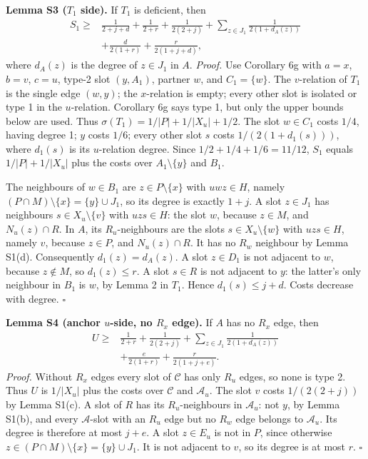 \textbf{Lemma S3 ($T_1$ side).} If $T_1$ is deficient, then
\[
\begin{aligned}
 S_1\ge{}&\frac1{2+j+d}+\frac1{2+r}+\frac1{2(2+j)}
       +\sum_{z\in J_1}\frac1{2(1+d_A(z))}\\
       &+\frac d{2(1+r)}+\frac r{2(1+j+d)},
\end{aligned}
\]
where $d_A(z)$ is the degree of $z\in J_1$ in $A$.
\emph{Proof.} Use Corollary 6g with $a=x$, $b=v$, $c=u$, type-2 slot $(y,A_1)$, partner $w$, and $C_1=\{w\}$. The $v$-relation of $T_1$ is the single edge $(w,y)$; the $x$-relation is empty; every other slot is isolated or type 1 in the $u$-relation. Corollary 6g says type 1, but only the upper bounds below are used. Thus $\sigma(T_1)=1/|P|+1/|X_u|+1/2$. The slot $w\in C_1$ costs $1/4$, having degree 1; $y$ costs $1/6$; every other slot $s$ costs $1/(2(1+d_1(s)))$, where $d_1(s)$ is its $u$-relation degree. Since $1/2+1/4+1/6=11/12$, $S_1$ equals $1/|P|+1/|X_u|$ plus the costs over $A_1\setminus\{y\}$ and $B_1$.

The neighbours of $w\in B_1$ are $z\in P\setminus\{x\}$ with $uwz\in H$, namely $(P\cap M)\setminus\{x\}=\{y\}\cup J_1$, so its degree is exactly $1+j$. A slot $z\in J_1$ has neighbours $s\in X_u\setminus\{v\}$ with $uzs\in H$: the slot $w$, because $z\in M$, and $N_u(z)\cap R$. In $A$, its $R_u$-neighbours are the slots $s\in X_u\setminus\{w\}$ with $uzs\in H$, namely $v$, because $z\in P$, and $N_u(z)\cap R$. It has no $R_w$ neighbour by Lemma S1(d). Consequently $d_1(z)=d_A(z)$. A slot $z\in D_1$ is not adjacent to $w$, because $z\notin M$, so $d_1(z)\le r$. A slot $s\in R$ is not adjacent to $y$: the latter's only neighbour in $B_1$ is $w$, by Lemma 2 in $T_1$. Hence $d_1(s)\le j+d$. Costs decrease with degree. \hfill$\square$

\textbf{Lemma S4 (anchor $u$-side, no $R_x$ edge).} If $A$ has no $R_x$ edge, then
\[
\begin{aligned}
 U\ge{}&\frac1{2+r}+\frac1{2(2+j)}+\sum_{z\in J_1}\frac1{2(1+d_A(z))}\\
 &+\frac e{2(1+r)}+\frac r{2(1+j+e)}.
\end{aligned}
\]
\emph{Proof.} Without $R_x$ edges every slot of $\mathcal C$ has only $R_u$ edges, so none is type 2. Thus $U$ is $1/|X_u|$ plus the costs over $\mathcal C$ and $\mathcal A_u$. The slot $v$ costs $1/(2(2+j))$ by Lemma S1(c). A slot of $R$ has its $R_u$-neighbours in $\mathcal A_u$: not $y$, by Lemma S1(b), and every $\mathcal A$-slot with an $R_u$ edge but no $R_w$ edge belongs to $\mathcal A_u$. Its degree is therefore at most $j+e$. A slot $z\in E_u$ is not in $P$, since otherwise $z\in(P\cap M)\setminus\{x\}=\{y\}\cup J_1$. It is not adjacent to $v$, so its degree is at most $r$. \hfill$\square$

